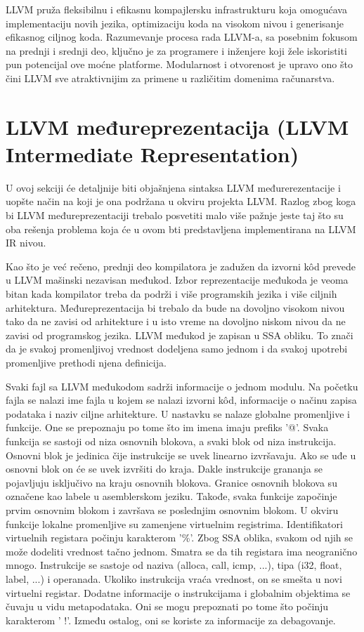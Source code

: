 \documentclass[12pt,oneside]{memoir}
\begin{document}
LLVM pruža fleksibilnu i efikasnu kompajlersku infrastrukturu koja omogućava implementaciju novih jezika, optimizaciju koda na visokom nivou i generisanje efikasnog ciljnog koda. Razumevanje procesa rada LLVM-a, sa posebnim fokusom na prednji i srednji deo, ključno je za programere i inženjere koji žele iskoristiti pun potencijal ove moćne platforme. Modularnost i otvorenost je upravo ono što čini LLVM sve atraktivnijim za primene u različitim domenima računarstva.

\section{LLVM međureprezentacija (LLVM Intermediate Representation)}
U ovoj sekciji će detaljnije biti objašnjena sintaksa LLVM međurerezentacije i uopšte način na koji je ona podržana u okviru projekta LLVM. Razlog zbog koga bi LLVM međureprezentaciji trebalo posvetiti malo više pažnje jeste taj što su oba rešenja problema koja će u ovom bti predstavljena implementirana na LLVM IR nivou.

Kao što je već rečeno, prednji deo kompilatora je zadužen da izvorni kôd prevede u LLVM mašinski nezavisan međukod. Izbor reprezentacije međukoda je veoma bitan kada kompilator treba da podrži i više programskih jezika i više ciljnih arhitektura. Međureprezentacija bi trebalo da bude na dovoljno visokom nivou tako da ne zavisi od arhitekture i u isto vreme na dovoljno niskom nivou da ne zavisi od programskog jezika.
LLVM međukod je zapisan u SSA obliku. To znači da je svakoj promenljivoj 
vrednost dodeljena samo jednom i da svakoj upotrebi promenljive prethodi njena 
definicija. 

Svaki fajl sa LLVM međukodom sadrži informacije o jednom modulu. Na početku
fajla se nalazi ime fajla u kojem se nalazi izvorni kôd, informacije o načinu 
zapisa podataka i naziv ciljne arhitekture. U nastavku se nalaze globalne 
promenljive i funkcije. One se prepoznaju po tome što im imena imaju prefiks 
’@’. Svaka funkcija se sastoji od niza osnovnih blokova, a svaki blok od niza 
instrukcija. Osnovni blok je jedinica čije instrukcije se uvek linearno 
izvršavaju. Ako se uđe u osnovni blok on će se uvek izvršiti do kraja. Dakle 
instrukcije grananja se pojavljuju isključivo na kraju osnovnih blokova. 
Granice osnovnih blokova su označene kao labele u asemblerskom jeziku. 
Takođe, svaka funkcije započinje prvim osnovnim blokom i završava se 
poslednjim osnovnim blokom. U okviru funkcije lokalne promenljive su zamenjene 
virtuelnim registrima. Identifikatori virtuelnih registara počinju karakterom 
’\%’. 
Zbog SSA oblika, svakom od njih se može dodeliti vrednost tačno jednom. Smatra 
se da tih registara ima neogranično mnogo.
Instrukcije se sastoje od naziva (alloca, call, icmp, ...), tipa (i32, float,
label, ...) i operanada. Ukoliko instrukcija vraća vrednost, on se smešta u novi
virtuelni registar. Dodatne informacije o instrukcijama i globalnim objektima se čuvaju u vidu metapodataka. Oni se mogu prepoznati po tome što počinju karakterom
’ !’. Između ostalog, oni se koriste za informacije za debagovanje. 
\end{document}
